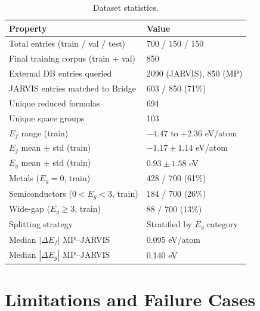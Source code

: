 \documentclass[10pt, a4paper]{article}
\begin{document}
\begin{table}[h!]
\centering
\caption{Dataset statistics.}
\label{tab:datacard}
\begin{tabular}{@{}ll@{}}
\toprule
Property & Value \\
\midrule
Total entries (train / val / test)   & 700 / 150 / 150 \\
Final training corpus (train + val)  & 850 \\
External DB entries queried          & 2090 (JARVIS), 850 (MP) \\
JARVIS entries matched to Bridge     & 603 / 850 (71\%) \\
Unique reduced formulas              & 694 \\
Unique space groups                  & 103 \\
$E_f$ range (train)                  & $-4.47$ to $+2.36$ eV/atom \\
$E_f$ mean $\pm$ std (train)         & $-1.17 \pm 1.14$ eV/atom \\
$E_g$ mean $\pm$ std (train)         & $0.93 \pm 1.58$ eV \\
Metals ($E_g = 0$, train)            & 428 / 700 (61\%) \\
Semiconductors ($0 < E_g < 3$, train) & 184 / 700 (26\%) \\
Wide-gap ($E_g \geq 3$, train)       & 88 / 700 (13\%) \\
Splitting strategy                   & Stratified by $E_g$ category \\
Median $|\Delta E_f|$ MP–JARVIS      & 0.095 eV/atom \\
Median $|\Delta E_g|$ MP–JARVIS      & 0.140 eV \\
\bottomrule
\end{tabular}
\end{table}

\section{Limitations and Failure Cases}
\end{document}

